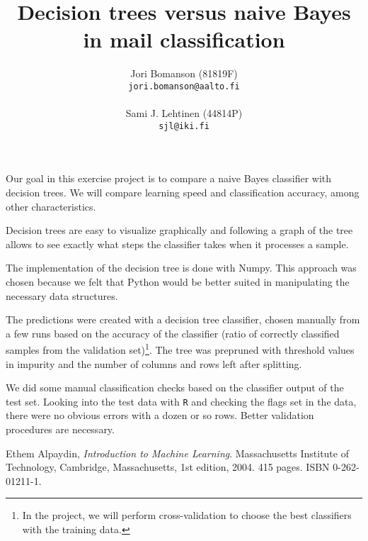 \documentclass[a4paper,10pt]{article}
\title{Decision trees versus naive Bayes in mail classification}
\author{Jori Bomanson (81819F) \\
  {\tt jori.bomanson@aalto.fi} \\
  \\
  Sami J. Lehtinen (44814P)\\ 
  {\tt sjl@iki.fi} \\
}
\begin{document}

\maketitle

Our goal in this exercise project is to compare a naive Bayes classifier
with decision trees.  We will compare learning speed and classification
accuracy, among other characteristics.

Decision trees are easy to visualize graphically and following a graph
of the tree allows to see exactly what steps the classifier takes when
it processes a sample.

The implementation of the decision tree is done with Numpy.  This
approach was chosen because we felt that Python would be better suited
in manipulating the necessary data structures.

The predictions were created with a decision tree classifier, chosen
manually from a few runs based on the accuracy of the classifier (ratio
of correctly classified samples from the validation set)\footnote{In the
  project, we will perform cross-validation to choose the best
  classifiers with the training data.}.  The tree was prepruned with
threshold values in impurity and the number of columns and rows left
after splitting.

We did some manual classification checks based on the classifier output
of the test set.  Looking into the test data with \texttt{R} and
checking the flags set in the data, there were no obvious errors with a
dozen or so rows.  Better validation procedures are necessary.

\begin{thebibliography}{9}
  Ethem Alpaydin,
  \emph{Introduction to Machine Learning}.
  Massachusetts Institute of Technology, Cambridge, Massachusetts,
  1st edition,
  2004. 415 pages. ISBN 0-262-01211-1.
\end{thebibliography}
\end{document}

